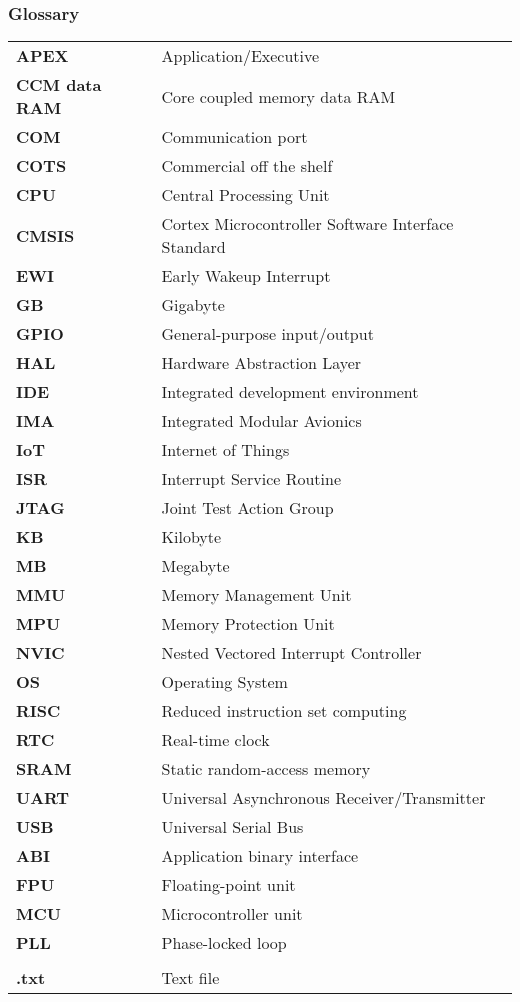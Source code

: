 \subsubsection*{Glossary}
\begin{longtable}{l p{12cm}}
\textbf{APEX}		& \qquad \qquad Application/Executive\\
\textbf{CCM data RAM}	& \qquad \qquad Core coupled memory data RAM\\
\textbf{COM}		& \qquad \qquad Communication port\\
\textbf{COTS}		& \qquad \qquad Commercial off the shelf\\
\textbf{CPU}		& \qquad \qquad Central Processing Unit\\
\textbf{CMSIS}		& \qquad \qquad Cortex Microcontroller Software Interface Standard\\
\textbf{EWI}		& \qquad \qquad Early Wakeup Interrupt\\
\textbf{GB}			& \qquad \qquad Gigabyte\\
\textbf{GPIO}		& \qquad \qquad General-purpose input/output\\
\textbf{HAL}		& \qquad \qquad Hardware Abstraction Layer\\
\textbf{IDE}		& \qquad \qquad Integrated development environment\\
\textbf{IMA}		& \qquad \qquad Integrated Modular Avionics\\
\textbf{IoT}		& \qquad \qquad Internet of Things\\
\textbf{ISR}		& \qquad \qquad Interrupt Service Routine\\
\textbf{JTAG}		& \qquad \qquad Joint Test Action Group\\
\textbf{KB}			& \qquad \qquad Kilobyte\\
\textbf{MB}			& \qquad \qquad Megabyte\\
\textbf{MMU}		& \qquad \qquad Memory Management Unit\\
\textbf{MPU}		& \qquad \qquad Memory Protection Unit\\
\textbf{NVIC}		& \qquad \qquad Nested Vectored Interrupt Controller\\
\textbf{OS}			& \qquad \qquad Operating System\\
\textbf{RISC}		& \qquad \qquad Reduced instruction set computing\\
\textbf{RTC}		& \qquad \qquad Real-time clock\\
\textbf{SRAM}		& \qquad \qquad Static random-access memory\\
\textbf{UART}		& \qquad \qquad Universal Asynchronous Receiver/Transmitter\\
\textbf{USB}		& \qquad \qquad Universal Serial Bus\\
\textbf{ABI}		& \qquad \qquad Application binary interface\\
\textbf{FPU}		& \qquad \qquad Floating-point unit\\
\textbf{MCU}		& \qquad \qquad Microcontroller unit\\
\textbf{PLL}		& \qquad \qquad Phase-locked loop\\
					& \\
\textbf{.txt}		& \qquad \qquad Text file\\

\end{longtable}
